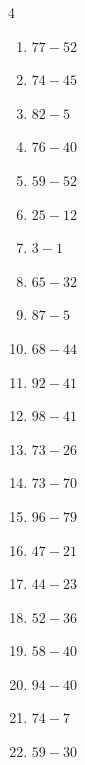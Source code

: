 \begin{multicols}{4}
\begin{enumerate}
  \item $77-52$
        \phantom{$=25$}

  \item $74-45$
        \phantom{$=29$}

  \item $82-5$
        \phantom{$=77$}

  \item $76-40$
        \phantom{$=36$}

  \item $59-52$
        \phantom{$=7$}

  \item $25-12$
        \phantom{$=13$}

  \item $3-1$
        \phantom{$=2$}

  \item $65-32$
        \phantom{$=33$}

  \item $87-5$
        \phantom{$=82$}

  \item $68-44$
        \phantom{$=24$}

  \item $92-41$
        \phantom{$=51$}

\columnbreak %

  \item $98-41$
        \phantom{$=57$}

  \item $73-26$
        \phantom{$=47$}

  \item $73-70$
        \phantom{$=3$}

  \item $96-79$
        \phantom{$=17$}

  \item $47-21$
        \phantom{$=26$}

  \item $44-23$
        \phantom{$=21$}

  \item $52-36$
        \phantom{$=16$}

  \item $58-40$
        \phantom{$=18$}

  \item $94-40$
        \phantom{$=54$}

  \item $74-7$
        \phantom{$=67$}

  \item $59-30$
        \phantom{$=29$}


\end{enumerate}
\end{multicols}
